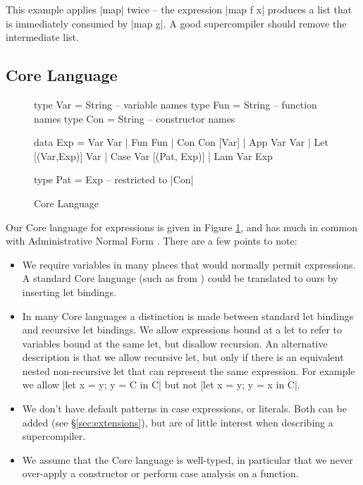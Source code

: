 \documentclass[draft]{sigplanconf}
\begin{document}
This example applies |map| twice -- the expression |map f x| produces a list that is immediately consumed by |map g|. A good supercompiler should remove the intermediate list.

\subsection{Core Language}
\label{sec:core}

\begin{figure}
\begin{code}
type Var   =   String -- variable names
type Fun   =   String -- function names
type Con   =   String -- constructor names

data Exp   =   Var Var
           |   Fun Fun
           |   Con Con [Var]
           |   App Var Var
           |   Let [(Var,Exp)] Var
           |   Case Var [(Pat, Exp)]
           |   Lam Var Exp

type Pat   =   Exp -- restricted to |Con|
\end{code}
\caption{Core Language}
\label{fig:core}
\end{figure}

Our Core language for expressions is given in Figure \ref{fig:core}, and has much in common with Administrative Normal Form \cite{flanagan:continuations}. There are a few points to note:

\begin{itemize}
\item We require variables in many places that would normally permit expressions. A standard Core language (such as from \citet{ghc_core}) could be translated to ours by inserting let bindings.
\item In many Core languages a distinction is made between standard let bindings and recursive let bindings. We allow expressions bound at a let to refer to variables bound at the same let, but disallow recursion. An alternative description is that we allow recursive let, but only if there is an equivalent nested non-recursive let that can represent the same expression. For example we allow |let x = y; y = C in C| but not |let x = y; y = x in C|.
\item We don't have default patterns in case expressions, or literals. Both can be added (see \S\ref{sec:extensions}), but are of little interest when describing a supercompiler.
\item We assume that the Core language is well-typed, in particular that we never over-apply a constructor or perform case analysis on a function.
\end{itemize}
\end{document}
